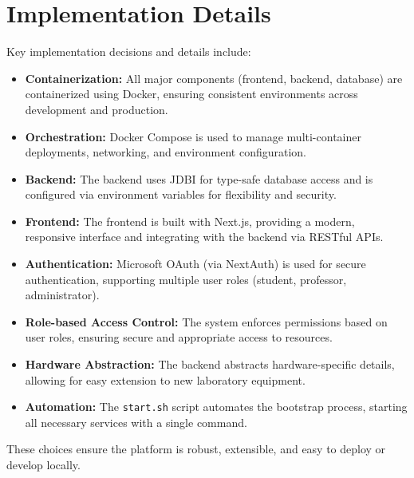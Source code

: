 \section{Implementation Details}

Key implementation decisions and details include:

\begin{itemize}
    \item \textbf{Containerization:} All major components (frontend, backend, database) are containerized using Docker, ensuring consistent environments across development and production.
    \item \textbf{Orchestration:} Docker Compose is used to manage multi-container deployments, networking, and environment configuration.
    \item \textbf{Backend:} The backend uses JDBI for type-safe database access and is configured via environment variables for flexibility and security.
    \item \textbf{Frontend:} The frontend is built with Next.js, providing a modern, responsive interface and integrating with the backend via RESTful APIs.
    \item \textbf{Authentication:} Microsoft OAuth (via NextAuth) is used for secure authentication, supporting multiple user roles (student, professor, administrator).
    \item \textbf{Role-based Access Control:} The system enforces permissions based on user roles, ensuring secure and appropriate access to resources.
    \item \textbf{Hardware Abstraction:} The backend abstracts hardware-specific details, allowing for easy extension to new laboratory equipment.
    \item \textbf{Automation:} The \texttt{start.sh} script automates the bootstrap process, starting all necessary services with a single command.
\end{itemize}

These choices ensure the platform is robust, extensible, and easy to deploy or develop locally. 